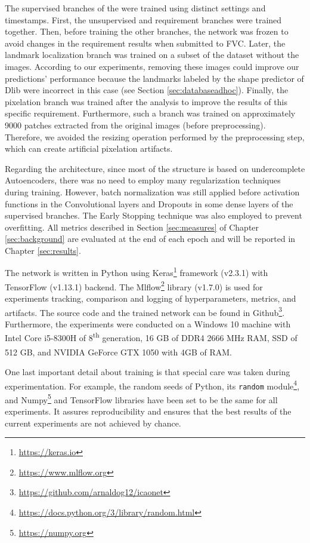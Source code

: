 The supervised branches of the \methodname were trained using distinct settings and timestamps. First, the unsupervised and requirement branches were trained together. Then, before training the other branches, the network was frozen to avoid changes in the requirement results when submitted to FVC. Later, the landmark localization branch was trained on a subset of the \adhoc dataset without the \darktintedlenses images. According to our experiments, removing these images could improve our predictions' performance because the landmarks labeled by the shape predictor of Dlib were incorrect in this case (see Section \ref{sec:databaseadhoc}). Finally, the pixelation branch was trained after the analysis to improve the results of this specific requirement. Furthermore, such a branch was trained on approximately 9000 patches extracted from the original images (before preprocessing). Therefore, we avoided the resizing operation performed by the preprocessing step, which can create artificial pixelation artifacts.
 
Regarding the architecture, since most of the \methodname structure is based on undercomplete Autoencoders, there was no need to employ many regularization techniques during training. However, batch normalization was still applied before activation functions in the Convolutional layers and Dropouts in some dense layers of the supervised branches. The Early Stopping technique was also employed to prevent overfitting. All metrics described in Section \ref{sec:measures} of Chapter \ref{sec:background} are evaluated at the end of each epoch and will be reported in Chapter \ref{sec:results}.
 
The network is written in Python using Keras\footnote{\url{https://keras.io}} framework (v2.3.1) with TensorFlow (v1.13.1) backend. The Mlflow\footnote{\url{https://www.mlflow.org}} library (v1.7.0) is used for experiments tracking, comparison and logging of hyperparameters, metrics, and artifacts. The source code and the trained network can be found in Github\footnote{\url{https://github.com/arnaldog12/icaonet}}. Furthermore, the experiments were conducted on a Windows 10 machine with Intel\textsuperscript{\tiny\textregistered} Core\textsuperscript{\tiny\texttrademark} i5-8300H of 8\textsuperscript{th} generation, 16 GB of DDR4 2666 MHz RAM, SSD of 512 GB, and NVIDIA\textsuperscript{\tiny\textregistered} GeForce\textsuperscript{\tiny\textregistered} GTX 1050 with 4GB of RAM.
 
One last important detail about \methodname training is that special care was taken during experimentation. For example, the random seeds of Python, its \texttt{random} module\footnote{\url{https://docs.python.org/3/library/random.html}}, and Numpy\footnote{\url{https://numpy.org}} and TensorFlow libraries have been set to be the same for all experiments. It assures reproducibility and ensures that the best results of the current experiments are not achieved by chance.
 
